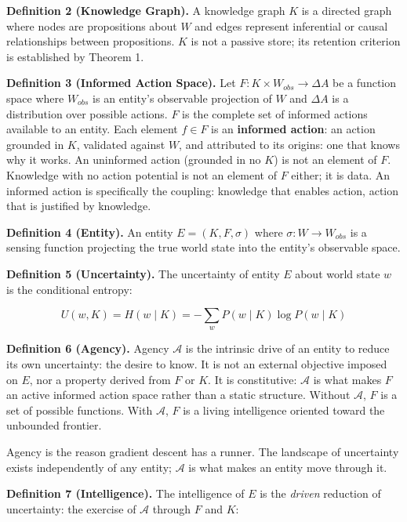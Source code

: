 \documentclass[
]{article}
\begin{document}
\textbf{Definition 2 (Knowledge Graph).} A knowledge graph \(K\) is a
directed graph where nodes are propositions about \(W\) and edges
represent inferential or causal relationships between propositions.
\(K\) is not a passive store; its retention criterion is established by
Theorem 1.

\textbf{Definition 3 (Informed Action Space).} Let
\(F : K \times W_{obs} \rightarrow \Delta A\) be a function space where
\(W_{obs}\) is an entity's observable projection of \(W\) and
\(\Delta A\) is a distribution over possible actions. \(F\) is the
complete set of informed actions available to an entity. Each element
\(f \in F\) is an \textbf{informed action}: an action grounded in \(K\),
validated against \(W\), and attributed to its origins: one that knows
why it works. An uninformed action (grounded in no \(K\)) is not an
element of \(F\). Knowledge with no action potential is not an element
of \(F\) either; it is data. An informed action is specifically the
coupling: knowledge that enables action, action that is justified by
knowledge.

\textbf{Definition 4 (Entity).} An entity \(E = (K, F, \sigma)\) where
\(\sigma : W \rightarrow W_{obs}\) is a sensing function projecting the
true world state into the entity's observable space.

\textbf{Definition 5 (Uncertainty).} The uncertainty of entity \(E\)
about world state \(w\) is the conditional entropy:

\[U(w, K) = H(w \mid K) = -\sum_w P(w \mid K) \log P(w \mid K)\]

\textbf{Definition 6 (Agency).} Agency \(\mathcal{A}\) is the intrinsic
drive of an entity to reduce its own uncertainty: the desire to know. It
is not an external objective imposed on \(E\), nor a property derived
from \(F\) or \(K\). It is constitutive: \(\mathcal{A}\) is what makes
\(F\) an active informed action space rather than a static structure.
Without \(\mathcal{A}\), \(F\) is a set of possible functions. With
\(\mathcal{A}\), \(F\) is a living intelligence oriented toward the
unbounded frontier.

Agency is the reason gradient descent has a runner. The landscape of
uncertainty exists independently of any entity; \(\mathcal{A}\) is what
makes an entity move through it.

\textbf{Definition 7 (Intelligence).} The intelligence of \(E\) is the
\emph{driven} reduction of uncertainty: the exercise of \(\mathcal{A}\)
through \(F\) and \(K\):
\end{document}
